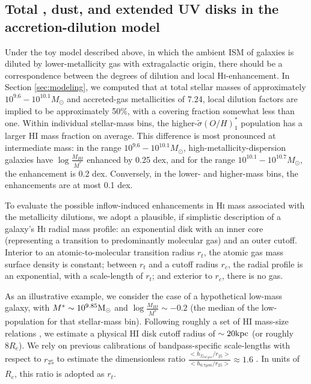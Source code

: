 \subsection{Total \hi, dust, and extended UV disks in the accretion-dilution model}
\label{subsec:hifrac_diversity}

Under the toy model described above, in which the ambient ISM of galaxies is diluted by lower-metallicity gas with extragalactic origin, there should be a correspondence between the degrees of dilution and local H\textsc{i}-enhancement. In Section \ref{sec:modeling}, we computed that at total stellar masses of approximately $10^{9.6}-10^{10.1} M_{\odot}$ and accreted-gas metallicities of 7.24, local dilution factors are implied to be approximately 50\%, with a covering fraction somewhat less than one. Within individual stellar-mass bins, the higher-$\tilde{\sigma}(O/H)^*_1$ population has a larger HI mass fraction on average. This difference is most pronounced at intermediate mass: in the range $10^{9.6}-10^{10.1} M_{\odot}$, high-metallicity-dispersion galaxies have $\log \frac{M_{HI}}{M^*}$ enhanced by 0.25 dex, and for the range $10^{10.1}-10^{10.7} M_{\odot}$, the enhancement is 0.2 dex. Conversely, in the lower- and higher-mass bins, the enhancements are at most 0.1 dex.

To evaluate the possible inflow-induced enhancements in H\textsc{i} mass associated with the metallicity dilutions, we adopt a plausible, if simplistic description of a galaxy's H\textsc{i} radial mass profile: an exponential disk with an inner core (representing a transition to predominantly molecular gas) and an outer cutoff. Interior to an atomic-to-molecular transition radius $r_t$, the atomic gas mass surface density is constant; between $r_t$ and a cutoff radius $r_c$, the radial profile is an exponential, with a scale-length of $r_t$; and exterior to $r_c$, there is no gas. 

As an illustrative example, we consider the case of a hypothetical low-mass galaxy, with $M^* \sim 10^{9.85} {\rm M_{\odot}}$ and $\log \frac{M_{HI}}{M^*} \sim -0.2$ (the median of the low-\metdisp population for that stellar-mass bin). Following roughly a set of HI mass-size relations \citep[, as collated and expanded in \citealt{blue-bird_davis_2020}]{verheijen_sancisi_2001_hi-mass-size, wang_koribalski_2016_hi-mass-size, diskmass_x_martinsson_2016}, we estimate a physical HI disk cutoff radius of $\sim 20 {\rm kpc}$ (or roughly $8 R_e$). We rely on previous calibrations of bandpass-specific scale-lengths with respect to $r_{25}$ to estimate the dimensionless ratio $\frac{<h_{\Sigma_{tot~gas}} / r_{25}>}{<h_{0.7 \mu m} / r_{25}>} \approx 1.6$ \citep[see][Table 7]{casasola_2017_dustpedia-scalelengths}. In units of $R_e$, this ratio is adopted as $r_t$.

